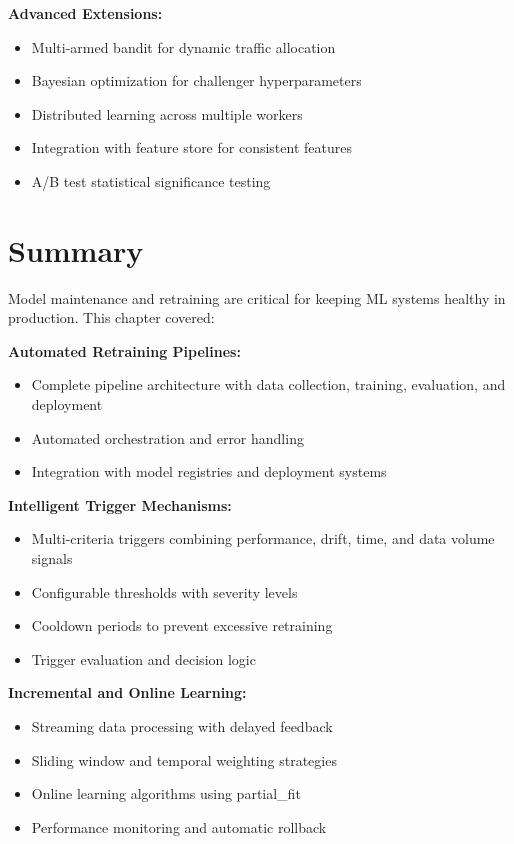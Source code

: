 \textbf{Advanced Extensions:}
\begin{itemize}
    \item Multi-armed bandit for dynamic traffic allocation
    \item Bayesian optimization for challenger hyperparameters
    \item Distributed learning across multiple workers
    \item Integration with feature store for consistent features
    \item A/B test statistical significance testing
\end{itemize}

\section{Summary}

Model maintenance and retraining are critical for keeping ML systems healthy in production. This chapter covered:

\textbf{Automated Retraining Pipelines:}
\begin{itemize}
    \item Complete pipeline architecture with data collection, training, evaluation, and deployment
    \item Automated orchestration and error handling
    \item Integration with model registries and deployment systems
\end{itemize}

\textbf{Intelligent Trigger Mechanisms:}
\begin{itemize}
    \item Multi-criteria triggers combining performance, drift, time, and data volume signals
    \item Configurable thresholds with severity levels
    \item Cooldown periods to prevent excessive retraining
    \item Trigger evaluation and decision logic
\end{itemize}

\textbf{Incremental and Online Learning:}
\begin{itemize}
    \item Streaming data processing with delayed feedback
    \item Sliding window and temporal weighting strategies
    \item Online learning algorithms using partial\_fit
    \item Performance monitoring and automatic rollback
\end{itemize}

